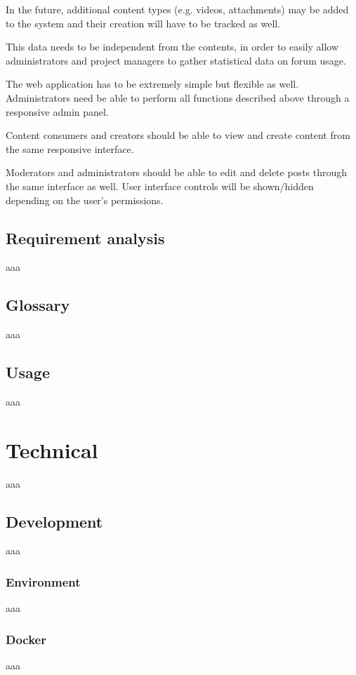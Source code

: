 \documentclass[12pt]{report}
\begin{document}
            In the future, additional content types (e.g. videos, attachments) may be added to the system and their creation will have to be tracked as well.

            This data needs to be independent from the contents, in order to easily allow administrators and project managers to gather statistical data on forum usage.

            The web application has to be extremely simple but flexible as well. Administrators need be able to perform all functions described above through a responsive admin panel.

            Content consumers and creators should be able to view and create content from the same responsive interface.

            Moderators and administrators should be able to edit and delete posts through the same interface as well. User interface controls will be shown/hidden depending on the user’s permissions.

        \chapter{Requirement analysis}
            aaa

        \chapter{Glossary}
            aaa

        \chapter{Usage}
            aaa

    \part{Technical}
        aaa

        \chapter{Development}
            aaa

            \section{Environment}
                aaa

            \section{Docker}
                aaa
\end{document}
